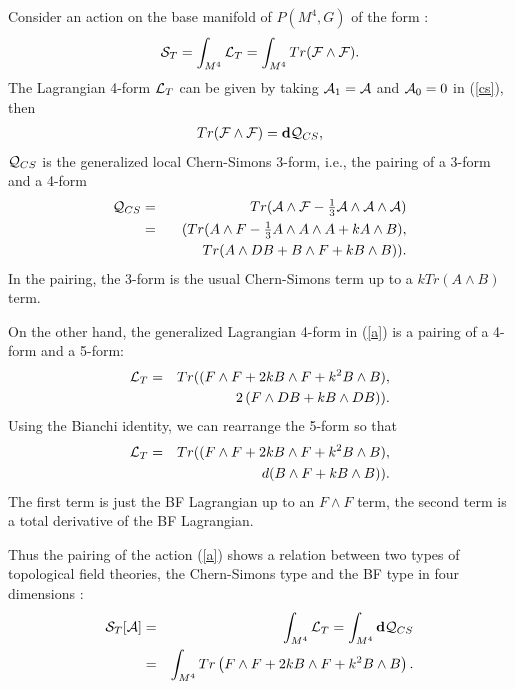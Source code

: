 \documentclass[a4paper,twocolumn,showpacs,prd]{revtex4}
\begin{document}
Consider  an action on the base manifold of
$P(M^4, G)$ of the form :
\begin{eqnarray}\label{a}
{\cal S}_T=\int_{M^4}{\cal L}_T=\int_{M^4} Tr ({\cal F}\wedge
{\cal F}).
\end{eqnarray}
The Lagrangian 4-form ${\cal L}_T$ can be given
by taking ${\cal A}_1={\cal A}$ and ${\cal
A}_0=0$ in (\ref{cs}), then
\begin{eqnarray}\label{GCW}
Tr ({\cal F}\wedge {\cal F})={\bf d}{\cal Q}_{CS},
\end{eqnarray}
${\cal Q}_{CS}$ is the generalized local Chern-Simons 3-form,
i.e., the  pairing of a 3-form and a 4-form
\begin{eqnarray}\label{CS}{\cal Q}_{CS}
&=& Tr ({\cal A} \wedge {\cal F}-{\textstyle{1\over3}}
{\cal A} \wedge {\cal A} \wedge {\cal A})\nonumber\\
&=& ( Tr (A \wedge F - {\textstyle{1\over3}} A \wedge A \wedge A
+k A\wedge B),  \nonumber\\
&& \qquad ~ Tr( A \wedge DB+B\wedge F+k B\wedge B) ).
\end{eqnarray}
In the pairing,  the 3-form is the usual Chern-Simons term up to a
$k Tr(A\wedge B)$ term.

On the other hand, the generalized Lagrangian 4-form in (\ref{a})
is a pairing of a 4-form and a 5-form:
\begin{eqnarray}
{\cal L}_{T}%
&=& Tr( (F\wedge F + 2k B\wedge F+k^2 B \wedge B), \nonumber\\
&&\qquad 2\, (F \wedge DB+k B\wedge DB) ).
\end{eqnarray}
Using the Bianchi identity, we can rearrange the
5-form so that
\begin{eqnarray}
{\cal L}_{T}&=& Tr((F \wedge F + 2k B\wedge F+k^2 B\wedge
B), \nonumber\\
&&\qquad ~ d ( B \wedge F+k B\wedge B ) ).
\end{eqnarray}
The first term is just the BF Lagrangian up to an
$F\wedge F$ term, the second term is a total
derivative of the BF Lagrangian.

Thus the pairing of the action (\ref{a}) shows a relation between
two types of topological field theories, the Chern-Simons type and
the BF type in four dimensions :
\begin{eqnarray}
{\cal S}_{T}[{\cal A}]
&=&\int_{M^4} {\cal L}_T=\int_{M^4} {\bf d}{\cal Q}_{CS} \nonumber\\
 &=& \int_{M^4}  Tr \left( F\wedge F + 2 k B \wedge F + k^2 B\wedge
 B \right).
 \end{eqnarray}
\end{document}
